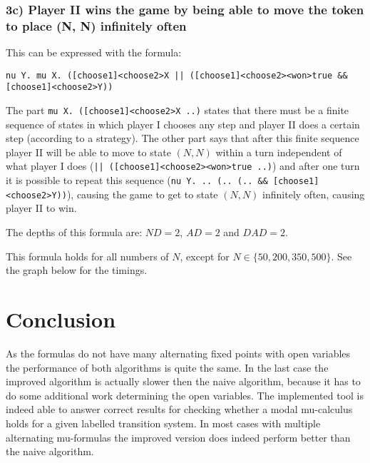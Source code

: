 \documentclass[10pt,a4paper]{article}
\begin{document}
\subsubsection{3c) Player II wins the game by being able to move the token to place (N, N) infinitely often}
This can be expressed with the formula:

\begin{center}
	{\tt nu Y. mu X. ([choose1]<choose2>X || ([choose1]<choose2><won>true \&\& [choose1]<choose2>Y))}
\end{center}

The part {\tt mu X. ([choose1]<choose2>X ..)} states that there must be a finite sequence of states in which player I chooses any step and player II does a certain step (according to a strategy). The other part says that after this finite sequence player II will be able to move to state $(N, N)$ within a turn independent of what player I does ({\tt || ([choose1]<choose2><won>true ..)}) and after one turn it is possible to repeat this sequence ({\tt nu Y. .. (.. (.. \&\& [choose1]<choose2>Y))}), causing the game to get to state $(N, N)$ infinitely often, causing player II to win.

The depths of this formula are: $ND = 2$, $AD = 2$ and $DAD = 2$.

This formula holds for all numbers of $N$, except for $N \in \{50, 200, 350, 500\}$. See the graph below for the timings.



\section{Conclusion}\label{conc}

As the formulas do not have many alternating fixed points with open variables the performance of both algorithms is quite the same. In the last case the improved algorithm is actually slower then the naive algorithm, because it has to do some additional work determining the open variables.
The implemented tool is indeed able to answer correct results for checking whether a modal mu-calculus holds for a given labelled transition system. In most cases with multiple alternating mu-formulas the improved version does indeed perform better than the naive algorithm.
\end{document}
